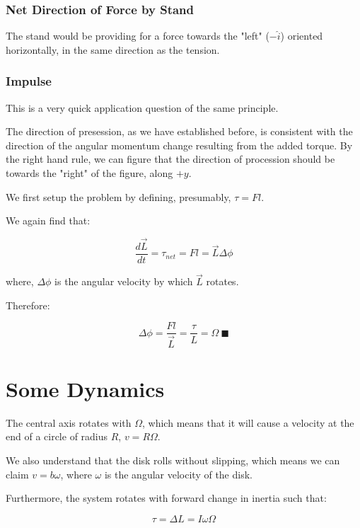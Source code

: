 \documentclass[letterpaper]{article}
\begin{document}
\subsubsection{Net Direction of Force by Stand}
\label{sec:org7650509}
The stand would be providing for a force towards the "left" (\(-\hat{i}\)) oriented horizontally, in the same direction as the tension.

\subsubsection{Impulse}
\label{sec:orgce1e1f4}
This is a very quick application question of the same principle. 

The direction of presession, as we have established before, is consistent with the direction of the angular momentum change resulting from the added torque. By the right hand rule, we can figure that the direction of procession should be towards the "right" of the figure, along \(+y\).

We first setup the problem by defining, presumably, \(\tau = Fl\). 

We again find that:

\begin{equation}
   \frac{d\vec{L}}{dt}  = \tau_{net} = Fl = \vec{L}\Delta \phi
\end{equation}

where, \(\Delta \phi\) is the angular velocity by which \(\vec{L}\) rotates.

Therefore:

\begin{equation}
 \Delta \phi = \frac{Fl}{\vec{L}} = \frac{\tau}{L} = \Omega\ \blacksquare
\end{equation}

\section{Some Dynamics}
\label{sec:org109e3a9}
The central axis rotates with \(\Omega\), which means that it will cause a velocity at the end of a circle of radius \(R\), \(v = R\Omega\).

We also understand that the disk rolls without slipping, which means we can claim \(v = b\omega\), where \(\omega\) is the angular velocity of the disk.

Furthermore, the system rotates with forward change in inertia such that:

\begin{equation}
   \tau = \Delta L = I\omega \Omega
\end{equation}
\end{document}
